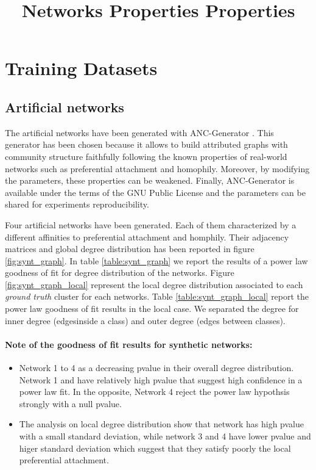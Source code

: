 \documentclass[a4paper, 12pt]{article}
\title{Networks Properties Properties}
\begin{document}
\maketitle
\tableofcontents

\section{Training Datasets}

\subsection{Artificial networks}

The artificial networks have been generated with ANC-Generator \cite{largeron2015}. This generator has been chosen because it allows to build attributed graphs with  community structure faithfully following the known properties of real-world networks such as preferential attachment and homophily.
Moreover, by modifying the parameters, these properties can be weakened. Finally, ANC-Generator is available under the terms of the GNU Public License and the        parameters can be shared for experiments reproducibility.

Four artificial networks have been generated. Each of them characterized by a different affinities to preferential attachment and homphily. Their adjacency matrices and global degree distribution has been reported in figure \ref{fig:synt_graph}. In table \ref{table:synt_graph} we report the results of a power law goodness of fit for degree distribution of the networks. Figure \ref{fig:synt_graph_local} represent the local degree distribution associated to each \emph{ground truth} cluster for each networks. Table \ref{table:synt_graph_local} report the power law goodness of fit results in the local case. We separated the degree for inner degree (edgesinside a class) and outer degree (edges between classes).

\paragraph{Note of the goodness of fit results for synthetic networks:}
\begin{itemize}
    \item Network 1 to 4 as a decreasing pvalue in their overall degree distribution. Network 1 and have relatively high pvalue that suggest high confidence in a power law fit. In the opposite, Network 4 reject the power law hypothsis strongly with a null pvalue.
    \item The analysis on local degree distribution show that network has high pvalue with a small standard deviation, while network 3 and 4 have lower pvalue and higer standard deviation  which suggest that they satisfy poorly the local preferential attachment.
\end{itemize}
\end{document}
